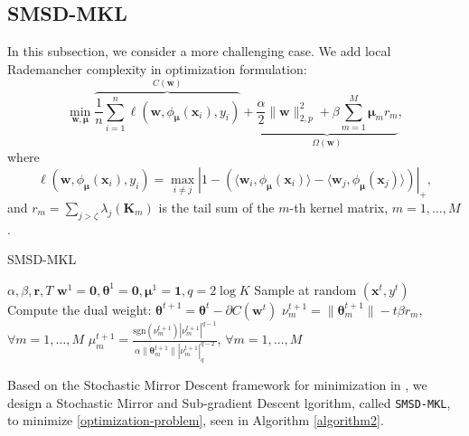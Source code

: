 \documentclass{article}
\begin{document}
\subsection{SMSD-MKL}
In this subsection, we consider a more challenging case.
We add local Rademancher complexity in optimization formulation:
\begin{equation}
\label{optimization-problem}
    \min_{\mathbf w,\bm \mu}
    \overbrace{\frac{1}{n}\sum_{i=1}^n\ell(\mathbf w,\phi_{\bm \mu}(\mathbf{x}_i), y_i)}^{C(\mathbf w)}
    +\underbrace{\frac{\alpha}{2}\|\mathbf w\|_{2,p}^2
    +\beta\sum_{m=1}^M\mathbf{\mu}_mr_m}_{\Omega(\mathbf w)},
\end{equation}
where
$$\ell(\mathbf w,\phi_{\bm \mu}(\mathbf{x}_i), y_i)=
\max\limits_{i \not= j}\left|1-\left(\langle\mathbf w_i,
\phi_{\bm \mu}(\mathbf{x}_i)\rangle -\langle\mathbf w_j, \phi_{\bm \mu}(\mathbf{x}_j)\rangle\right)\right|_+,$$
and
$r_m=\sum_{j>\zeta}\lambda_j(\mathbf{K}_m)$ is the tail sum of the $m$-th kernel matrix,  $m=1,\ldots, M$.

\begin{algorithm}[t]
   \caption{SMSD-MKL}
   \label{algorithm2}
    \begin{algorithmic}
        $\alpha, \beta, \bm r, T$
        $\mathbf w^1=\mathbf{0}, \pmb{\theta}^1=\mathbf{0}, \bm \mu^1=\mathbf{1}, q=2\log K $
       \STATE Sample at random $(\mathbf{x}^t, y^t)$
       \STATE Compute the dual weight: $\pmb{\theta}^{t+1}=\pmb{\theta}^t-\partial{C(\mathbf w^t)}$
       \STATE $\nu_m^{t+1}=\|\bm \theta_m^{t+1}\|-t\beta r_m$, $\forall m=1,\ldots, M$
       \STATE $\mu_m^{t+1}=\frac{\mathrm{sgn}(\nu_m^{t+1})|\nu_m^{t+1}|^{q-1}}
       {\alpha\|\bm \theta_m^{t+1}\||\nu_m^{t+1}|_q^{q-2}}$, $\forall m=1,\ldots, M$
       \ENDFOR
    \end{algorithmic}
\end{algorithm}

Based on the Stochastic Mirror Descent framework for minimization in \cite{Shalev-ShwartzT11, OrabonaL11},
we design a Stochastic Mirror and Sub-gradient Descent lgorithm, called \texttt{SMSD-MKL}, to minimize \eqref{optimization-problem},
seen in Algorithm \ref{algorithm2}.
\end{document}
